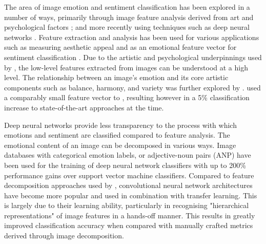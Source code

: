 \documentclass{article}
\begin{document}
The area of image emotion and sentiment classification has been explored in a number of ways, primarily through image feature analysis derived from art and psychological factors \citep{machajdik2010affective}; and more recently using techniques such as deep neural networks \citep{chen2015learning, kim2018building}.
Feature extraction and analysis has been used for various applications such as measuring aesthetic appeal \citep{den2010using,den2010comparing,den2011evolving} and as an emotional feature vector for sentiment classification \citep{machajdik2010affective}.
Due to the artistic and psychological underpinnings used by \citet{machajdik2010affective}, the low-level features extracted from images can be understood at a high level.
The relationship between an image's emotion and its core artistic components such as balance, harmony, and variety was further explored by \citet{zhao2014exploring}.
\citet{zhao2014exploring} used a comparably small feature vector to \citet{machajdik2010affective}, resulting however in a 5\% classification increase to state-of-the-art approaches at the time.

Deep neural networks provide less transparency to the process with which emotions and sentiment are classified compared to feature analysis.
The emotional content of an image can be decomposed in various ways.
Image databases with categorical emotion labels, or adjective-noun pairs (ANP) have been used for the training of deep neural network classifiers \citep{chen2014deepsentibank, yang2018visual} with up to 200\% performance gains over support vector machine classifiers.
Compared to feature decomposition approaches used by \citet{machajdik2010affective}, convolutional neural network architectures have become more popular and used in combination with transfer learning.
This is largely due to their learning ability, particularly in recognising "hierarchical representations" \citep{lipton2015critical} of image features in a hands-off manner.
This results in greatly improved classification accuracy when compared with manually crafted metrics derived through image decomposition.
\end{document}

